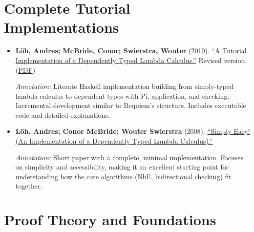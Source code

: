 \documentclass[11pt]{article}
\begin{document}
\section{Complete Tutorial Implementations}

\begin{itemize}[leftmargin=*]
\item \textbf{Löh, Andres; McBride, Conor; Swierstra, Wouter} (2010). \href{https://www.andres-loeh.de/LambdaPi/}{``A Tutorial Implementation of a Dependently Typed Lambda Calculus.''} Revised version. (\href{https://www.andres-loeh.de/LambdaPi/LambdaPi.pdf}{PDF})

\textit{Annotation:} Literate Haskell implementation building from simply-typed lambda calculus to dependent types with Pi, application, and checking. Incremental development similar to Requiem's structure. Includes executable code and detailed explanations.

\item \textbf{Löh, Andres; Conor McBride; Wouter Swierstra} (2008). \href{https://www.andres-loeh.de/LambdaPi/LambdaPi-short.pdf}{``Simply Easy! (An Implementation of a Dependently Typed Lambda Calculus).''}

\textit{Annotation:} Short paper with a complete, minimal implementation. Focuses on simplicity and accessibility, making it an excellent starting point for understanding how the core algorithms (NbE, bidirectional checking) fit together.

\end{itemize}

\section{Proof Theory and Foundations}
\end{document}
